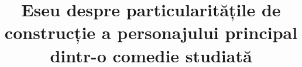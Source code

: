 

\title{Eseu despre particularitățile de construcție a personajului principal dintr-o comedie studiată}


 \maketitle %
 

